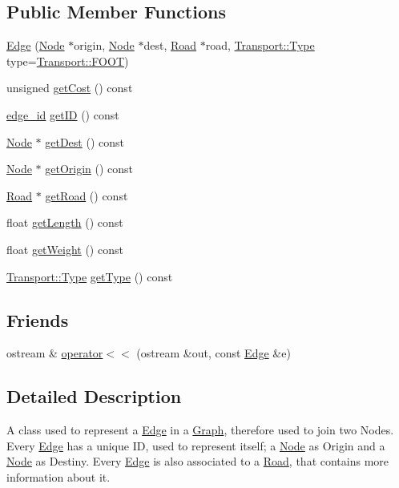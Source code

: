 \subsection*{Public Member Functions}
\begin{DoxyCompactItemize}
\item 
\hyperlink{class_edge_ae9995324a7970fb53ff489a518cac211}{Edge} (\hyperlink{class_node}{Node} $\ast$origin, \hyperlink{class_node}{Node} $\ast$dest, \hyperlink{class_road}{Road} $\ast$road, \hyperlink{class_transport_a1879cecfed0d4238e5a7af6d085db317}{Transport\+::\+Type} type=\hyperlink{class_transport_a1879cecfed0d4238e5a7af6d085db317a9eb45a1db8620c55d48eeee34f09980c}{Transport\+::\+F\+O\+OT})
\item 
unsigned \hyperlink{class_edge_ac047f6b04f3cb9b590058a2a96e303e7}{get\+Cost} () const
\item 
\hyperlink{_edge_8hpp_ad7d18d7b90a45b6625704e92d10aa3a0}{edge\+\_\+id} \hyperlink{class_edge_afb88989f2a1b21bdd1d5aaa4054486c3}{get\+ID} () const
\item 
\hyperlink{class_node}{Node} $\ast$ \hyperlink{class_edge_af2cd0f7cba34228f76c4b20a84a2de9d}{get\+Dest} () const
\item 
\hyperlink{class_node}{Node} $\ast$ \hyperlink{class_edge_a04719c702ae24dcfbce3874a573ca360}{get\+Origin} () const
\item 
\hyperlink{class_road}{Road} $\ast$ \hyperlink{class_edge_ae967ccaa1db4dba903ccfb3c55be9bc5}{get\+Road} () const
\item 
float \hyperlink{class_edge_ae96241bc7956c47dba61f7a0cfec01c3}{get\+Length} () const
\item 
float \hyperlink{class_edge_a873322923fa6340e17edb39b923f7d61}{get\+Weight} () const
\item 
\hyperlink{class_transport_a1879cecfed0d4238e5a7af6d085db317}{Transport\+::\+Type} \hyperlink{class_edge_ad36b220701f80c199f9b2ed7bb79a22f}{get\+Type} () const
\end{DoxyCompactItemize}
\subsection*{Friends}
\begin{DoxyCompactItemize}
\item 
ostream \& \hyperlink{class_edge_a4ba287cbdc78be9ec49dd1b67291039b}{operator$<$$<$} (ostream \&out, const \hyperlink{class_edge}{Edge} \&e)
\end{DoxyCompactItemize}


\subsection{Detailed Description}
A class used to represent a \hyperlink{class_edge}{Edge} in a \hyperlink{class_graph}{Graph}, therefore used to join two Nodes. Every \hyperlink{class_edge}{Edge} has a unique ID, used to represent itself; a \hyperlink{class_node}{Node} as Origin and a \hyperlink{class_node}{Node} as Destiny. Every \hyperlink{class_edge}{Edge} is also associated to a \hyperlink{class_road}{Road}, that contains more information about it. 

